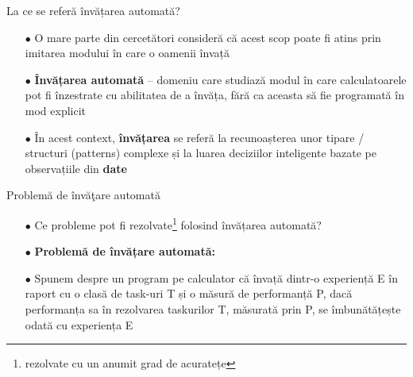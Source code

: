 \documentclass{beamer}
\begin{document}
\begin{frame}{La ce se referă învățarea automată?}
\begin{itemize}
	\item[$\bullet$] O mare parte din cercetători consideră că acest scop poate fi atins prin imitarea modului în care o oamenii învață
	\item[$\bullet$] \textbf{Învățarea automată} – domeniu care studiază modul în care calculatoarele pot fi înzestrate cu abilitatea de a învăța, fără ca aceasta să fie programată în mod explicit
	\item[$\bullet$] În acest context, \textbf{învățarea} se referă la recunoașterea unor tipare / structuri (patterns) complexe și la luarea deciziilor inteligente bazate pe observațiile din \textbf{date}
\end{itemize}
\end{frame}

\begin{frame}{Problemă  de învăţare automată}
\begin{itemize}
	\item[$\bullet$] Ce probleme pot fi rezolvate\footnote{rezolvate cu un anumit grad de acuratețe} folosind învățarea automată?
	\item[$\bullet$] \textbf{Problemă  de învățare automată:}
	\item[$\bullet$] Spunem despre un program pe calculator că învață dintr-o experiență E în raport cu o clasă de task-uri T și o măsură de performanță P, dacă performanța sa în rezolvarea taskurilor T, măsurată prin P, se îmbunătățește odată cu experiența E
\end{itemize}
\end{frame}
\end{document}
